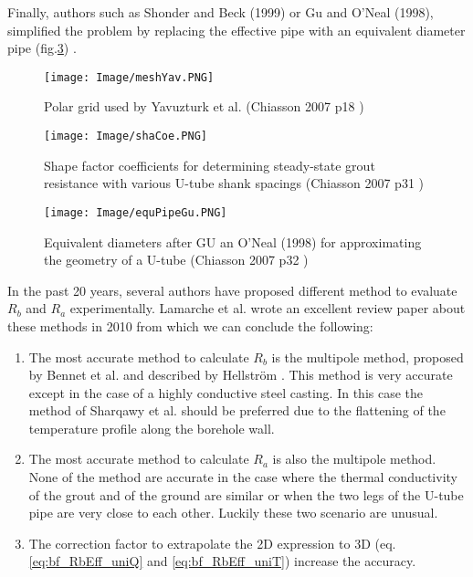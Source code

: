 \documentclass[a4paper,oneside,11pt]{report}
\begin{document}
Finally, authors such as Shonder and Beck (1999) or Gu and O'Neal (1998), simplified the problem by replacing the effective pipe with an equivalent diameter pipe (fig.\ref{fig:bf_equPipeGu}) \cite{chi07}.
\begin{figure}[hbtp]  
\centering
\texttt{[image: Image/meshYav.PNG]}
\caption{Polar grid used by Yavuzturk et al. (Chiasson 2007 p18 \cite{chi07})}
\label{fig:bf_meshYav}
\end{figure}

\begin{figure}[hbtp]
\centering
\texttt{[image: Image/shaCoe.PNG]}
\caption{Shape factor coefficients for determining steady-state grout resistance with various U-tube shank spacings (Chiasson 2007 p31 \cite{chi07})}
\label{fig:bf_shaCoe}
\end{figure}

\begin{figure}[hbtp] 
\centering
\texttt{[image: Image/equPipeGu.PNG]}
\caption{Equivalent diameters after GU an O'Neal (1998) for approximating the geometry of a U-tube (Chiasson 2007 p32 \cite{chi07})}
\label{fig:bf_equPipeGu}
\end{figure}

In the past 20 years, several authors have proposed different method to evaluate $R_b$ and $R_a$ experimentally. Lamarche et al. wrote an excellent review paper about these methods in 2010 from which we can conclude the following:
\begin{enumerate}
\item The most accurate method to calculate $R_b$ is the multipole method, proposed by Bennet et al. and described by Hellstr\"om \cite{ben87, hel91}. This method is very accurate except in the case of a highly conductive steel casting. In this case the method of Sharqawy et al. \cite{sha09} should be preferred due to the flattening of the temperature profile along the borehole wall.
\item The most accurate method to calculate $R_a$ is also the multipole method. None of the method are accurate in the case where the thermal conductivity of the grout and of the ground are similar or when the two legs of the U-tube pipe are very close to each other. Luckily these two scenario are unusual.
\item The correction factor to extrapolate the 2D expression to 3D (eq.\ref{eq:bf_RbEff_uniQ} and \ref{eq:bf_RbEff_uniT}) increase the accuracy.
\end{enumerate}
\end{document}
